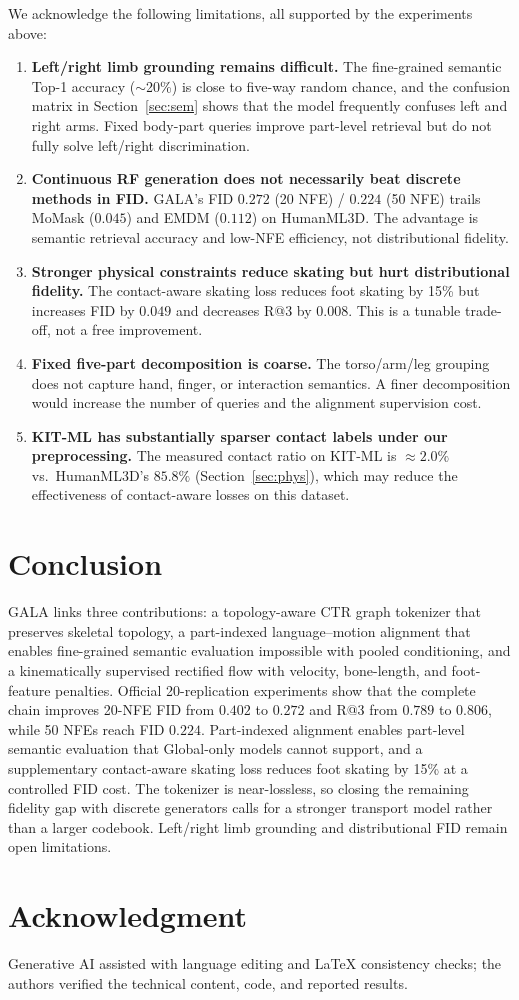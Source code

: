 \documentclass[journal]{IEEEtran}
\begin{document}
We acknowledge the following limitations, all supported by the experiments above:
\begin{enumerate}\itemsep2pt
\item \textbf{Left/right limb grounding remains difficult.} The fine-grained semantic Top-1 accuracy ($\sim$20\%) is close to five-way random chance, and the confusion matrix in Section~\ref{sec:sem} shows that the model frequently confuses left and right arms. Fixed body-part queries improve part-level retrieval but do not fully solve left/right discrimination.
\item \textbf{Continuous RF generation does not necessarily beat discrete methods in FID.} GALA's FID $0.272$ (20 NFE) / $0.224$ (50 NFE) trails MoMask ($0.045$) and EMDM ($0.112$) on HumanML3D. The advantage is semantic retrieval accuracy and low-NFE efficiency, not distributional fidelity.
\item \textbf{Stronger physical constraints reduce skating but hurt distributional fidelity.} The contact-aware skating loss reduces foot skating by 15\% but increases FID by $0.049$ and decreases R@3 by $0.008$. This is a tunable trade-off, not a free improvement.
\item \textbf{Fixed five-part decomposition is coarse.} The torso/arm/leg grouping does not capture hand, finger, or interaction semantics. A finer decomposition would increase the number of queries and the alignment supervision cost.
\item \textbf{KIT-ML has substantially sparser contact labels under our preprocessing.} The measured contact ratio on KIT-ML is $\approx2.0\%$ vs.\ HumanML3D's $85.8\%$ (Section~\ref{sec:phys}), which may reduce the effectiveness of contact-aware losses on this dataset.
\end{enumerate}

\section{Conclusion}

GALA links three contributions: a topology-aware CTR graph tokenizer that preserves skeletal topology, a part-indexed language--motion alignment that enables fine-grained semantic evaluation impossible with pooled conditioning, and a kinematically supervised rectified flow with velocity, bone-length, and foot-feature penalties. Official 20-replication experiments show that the complete chain improves 20-NFE FID from $0.402$ to $0.272$ and R@3 from $0.789$ to $0.806$, while 50 NFEs reach FID $0.224$. Part-indexed alignment enables part-level semantic evaluation that Global-only models cannot support, and a supplementary contact-aware skating loss reduces foot skating by 15\% at a controlled FID cost. The tokenizer is near-lossless, so closing the remaining fidelity gap with discrete generators calls for a stronger transport model rather than a larger codebook. Left/right limb grounding and distributional FID remain open limitations.

\section*{Acknowledgment}
Generative AI assisted with language editing and LaTeX consistency checks; the authors verified the technical content, code, and reported results.



\end{document}
